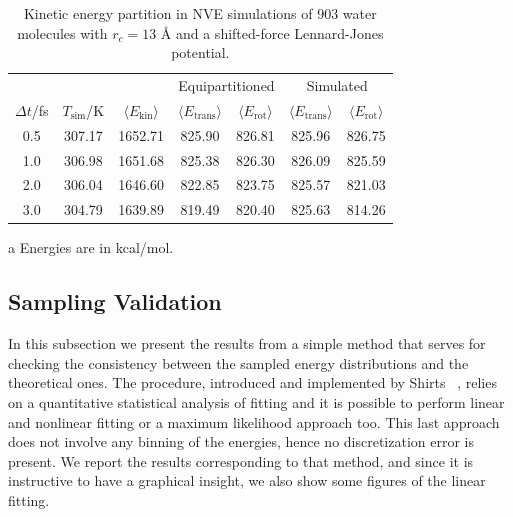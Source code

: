 \documentclass[aip,jcp,reprint,amsmath,amssymb,raggedbottom]{revtex4-1}
\begin{document}
\begin{table}
	\begin{threeparttable}
		\caption{Kinetic energy partition in NVE simulations of 903 water molecules with $r_c = 13$ {\AA} and a shifted-force Lennard-Jones potential.} %
		\label{table:water_partition_13A_LJ-SF}
		\begin{ruledtabular}
			\begin{tabular}{ccccccc}
				& & & \multicolumn{2}{c}{Equipartitioned} & \multicolumn{2}{c}{Simulated}\\
				\cline{4-7}
				$\Delta t$/fs & $T_\text{sim}$/K & $\langle E_\text{kin}\rangle$ & $\langle E_\text{trans}\rangle$ & $\langle E_\text{rot}\rangle$ & $\langle E_\text{trans}\rangle$ & $\langle E_\text{rot}\rangle$ \\
				\hline
				0.5 & 307.17 & 1652.71  & 825.90  & 826.81  & 825.96 & 826.75  \\
				1.0 & 306.98 & 1651.68  & 825.38  & 826.30  & 826.09 & 825.59  \\
				2.0 & 306.04 & 1646.60  & 822.85  & 823.75  & 825.57 & 821.03  \\
				3.0 & 304.79 & 1639.89  & 819.49  & 820.40  & 825.63 & 814.26
			\end{tabular}
		\end{ruledtabular}
		\begin{tablenotes}
			\item[a] Energies are in kcal/mol.
		\end{tablenotes}
	\end{threeparttable}
\end{table}

\subsection{Sampling Validation}
\label{sec:samplingvalidation}
In this subsection we present the results from a simple method that serves for checking the consistency between the sampled energy distributions and the theoretical ones. The procedure, introduced and implemented by Shirts ~\cite{Shirts2013}, relies on a quantitative statistical analysis of fitting and it is possible to perform linear and nonlinear fitting or a maximum likelihood approach too. This last approach does not involve any binning of the energies, hence no discretization error is present. We report the results corresponding to that method, and since it is instructive to have a graphical insight, we also show some figures of the linear fitting.
\end{document}
